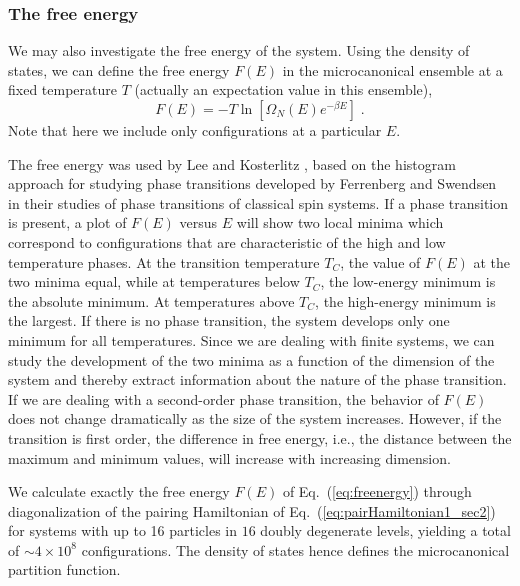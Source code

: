 \documentclass[preprint,rmp,aps,floatfix]{revtex4}
\begin{document}
\subsubsection{The free energy}

We may also investigate the free energy of the system.
Using the density of states, we can define
the  free energy $F(E)$ in the microcanonical ensemble 
at a fixed temperature $T$ (actually an expectation value in this ensemble), 
\begin{equation}
    F(E)=-T\ln\left[\Omega_N(E)e^{-\beta E}\right]\;.
    \label{eq:freenergy}
\end{equation}
Note that here we include only
configurations at a particular $E$.
 
The free energy was used by
Lee and Kosterlitz \cite{lk90,lk91},
based on the histogram approach for studying
phase transitions developed by Ferrenberg and Swendsen \cite{fs88,fs89}
in their studies of phase transitions
of classical spin systems.
If a phase transition is present, a plot of $F(E)$ versus $E$ will show
two local minima which correspond to configurations that are
characteristic of the high and low temperature phases.
At the transition temperature $T_C$, the value of $F(E)$ at the
two minima equal, while at temperatures below $T_C$, the low-energy
minimum is the absolute minimum. At temperatures above $T_C$, the high-energy
minimum is the largest. If there is no
phase transition, the system develops only one minimum for all temperatures.
Since we are dealing with finite systems, we can study the development
of the two minima as a function of the dimension of the system and thereby
extract information about the nature of the phase transition. If we are dealing
with a second-order phase transition, the behavior of $F(E)$ does not change
dramatically as the size of the system increases. However, if the transition
is first order, the difference in free energy, i.e.,
the distance between the maximum and minimum values,
will increase with increasing dimension.


We calculate exactly the  
free energy $F(E)$ of Eq.~(\ref{eq:freenergy})
through diagonalization of the pairing Hamiltonian of 
Eq.~(\ref{eq:pairHamiltonian1_sec2})
for systems with up to 16 particles in $16$ doubly degenerate
levels, yielding a total of $\sim 4\times 10^8$ configurations. The
density of states hence defines the microcanonical partition function.
\end{document}

